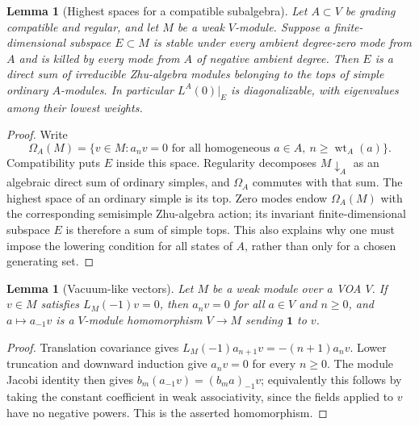 \documentclass[11pt,a4paper]{article}
\newtheorem{lemma}[theorem]{Lemma}
\theoremstyle{definition}
\begin{document}
\begin{lemma}[Highest spaces for a compatible subalgebra]
\label{lem:compatible-top}
Let $A\subset V$ be grading compatible and regular, and let $M$ be a
weak $V$-module. Suppose a finite-dimensional subspace $E\subset M$ is
stable under every ambient degree-zero mode from $A$ and is killed by
every mode from $A$ of negative ambient degree. Then $E$ is a direct
sum of irreducible Zhu-algebra modules belonging to the tops of simple
ordinary $A$-modules. In particular $L^A(0)|_E$ is diagonalizable,
with eigenvalues among their lowest weights.
\end{lemma}
\begin{proof}
Write
\[
 \Omega_A(M)=\{v\in M:a_nv=0\text{ for all homogeneous }a\in A,
                   \ n\ge\operatorname{wt}_A(a)\}.
\]
Compatibility puts $E$ inside this space. Regularity decomposes
$M\downarrow_A$ as an algebraic direct sum of ordinary simples, and
$\Omega_A$ commutes with that sum. The highest space of an ordinary
simple is its top. Zero modes endow $\Omega_A(M)$ with the corresponding
semisimple Zhu-algebra action; its invariant finite-dimensional
subspace $E$ is therefore a sum of simple tops. This also explains why
one must impose the lowering condition for all states of $A$, rather
than only for a chosen generating set.
\end{proof}

\begin{lemma}[Vacuum-like vectors]\label{lem:vacuum-like}
Let $M$ be a weak module over a VOA $V$. If $v\in M$ satisfies
$L_M(-1)v=0$, then $a_nv=0$ for all $a\in V$ and $n\ge0$, and
$a\mapsto a_{-1}v$ is a $V$-module homomorphism $V\to M$ sending
$\mathbf1$ to $v$.
\end{lemma}
\begin{proof}
Translation covariance gives
$L_M(-1)a_{n+1}v=-(n+1)a_nv$. Lower truncation and downward induction
give $a_nv=0$ for every $n\ge0$. The module Jacobi identity then gives
$b_m(a_{-1}v)=(b_ma)_{-1}v$; equivalently this follows by taking the
constant coefficient in weak associativity, since the fields applied
to $v$ have no negative powers. This is the asserted homomorphism.
\end{proof}
\end{document}
